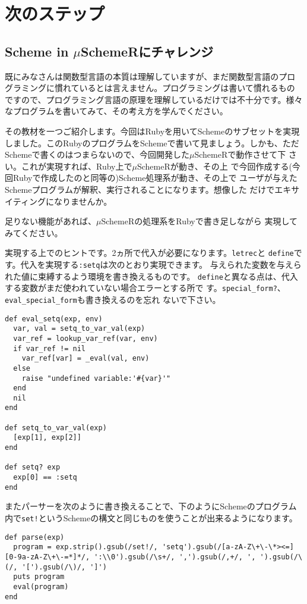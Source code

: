 \chapter{次のステップ\hspace{-3mm}}

\section{Scheme in $\mu$SchemeRにチャレンジ}
既にみなさんは関数型言語の本質は理解していますが、まだ関数型言語のプロ
グラミングに慣れているとは言えません。プログラミングは書いて慣れるもの
ですので、プログラミング言語の原理を理解しているだけでは不十分です。様々
なプログラムを書いてみて、その考え方を学んでください。

その教材を一つご紹介します。今回はRubyを用いてSchemeのサブセットを実現
しました。このRubyのプログラムをSchemeで書いて見ましょう。しかも、ただ
Schemeで書くのはつまらないので、今回開発した$\mu$SchemeRで動作させて下
さい。これが実現すれば、Ruby上で$\mu$SchemeRが動き、その上
で今回作成する(今回Rubyで作成したのと同等の)Scheme処理系が動き、その上で
ユーザが与えたSchemeプログラムが解釈、実行されることになります。想像した
だけでエキサイティングになりませんか。

足りない機能があれば、$\mu$SchemeRの処理系をRubyで書き足しながら
実現してみてください。

実現する上でのヒントです。2ヵ所で代入が必要になります。{\tt letrec}と
{\tt define}です。代入を実現する{\tt :setq}は次のとおり実現できます。
与えられた変数を与えられた値に束縛するよう環境を書き換えるものです。
{\tt define}と異なる点は、代入する変数がまだ使われていない場合エラーとする所で
す。{\tt special\_form?}、{\tt eval\_special\_form}も書き換えるのを忘れ
ないで下さい。

\begin{lstlisting}
def eval_setq(exp, env)
  var, val = setq_to_var_val(exp)
  var_ref = lookup_var_ref(var, env)
  if var_ref != nil
    var_ref[var] = _eval(val, env)
  else
    raise "undefined variable:'#{var}'"    
  end
  nil
end

def setq_to_var_val(exp)
  [exp[1], exp[2]]
end

def setq? exp
  exp[0] == :setq
end
\end{lstlisting}

またパーサーを次のように書き換えることで、下のようにSchemeのプログラム内で{\tt set!}というSchemeの構文と同じものを使うことが出来るようになります。

\begin{lstlisting}
def parse(exp)
  program = exp.strip().gsub(/set!/, 'setq').gsub(/[a-zA-Z\+\-\*><=][0-9a-zA-Z\+\-=*]*/, ':\\0').gsub(/\s+/, ',').gsub(/,+/, ', ').gsub(/\(/, '[').gsub(/\)/, ']')
  puts program
  eval(program)
end
\end{lstlisting}

